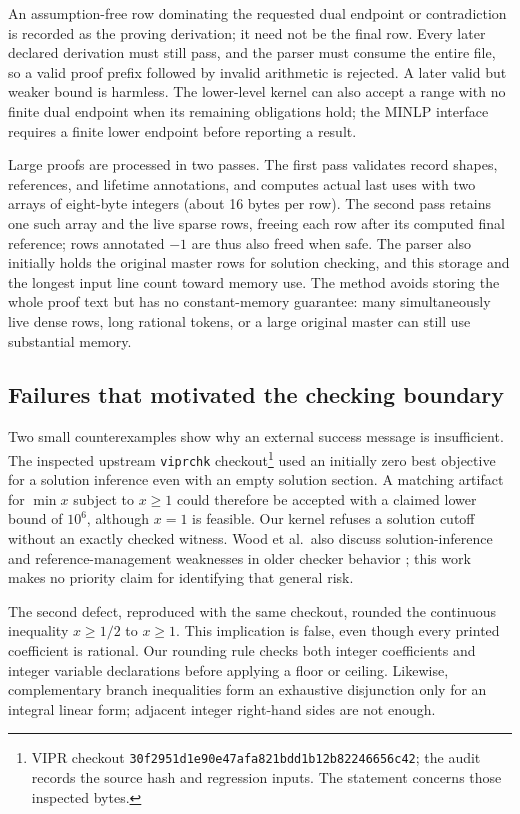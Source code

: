An assumption-free row dominating the requested dual endpoint or contradiction is recorded as the proving derivation; it need not be the final row. Every later declared derivation must still pass, and the parser must consume the entire file, so a valid proof prefix followed by invalid arithmetic is rejected. A later valid but weaker bound is harmless. The lower-level kernel can also accept a range with no finite dual endpoint when its remaining obligations hold; the MINLP interface requires a finite lower endpoint before reporting a result.

Large proofs are processed in two passes. The first pass validates record shapes, references, and lifetime annotations, and computes actual last uses with two arrays of eight-byte integers (about 16 bytes per row). The second pass retains one such array and the live sparse rows, freeing each row after its computed final reference; rows annotated $-1$ are thus also freed when safe. The parser also initially holds the original master rows for solution checking, and this storage and the longest input line count toward memory use. The method avoids storing the whole proof text but has no constant-memory guarantee: many simultaneously live dense rows, long rational tokens, or a large original master can still use substantial memory.

\subsection{Failures that motivated the checking boundary}
\label{sec:checker-repairs}
Two small counterexamples show why an external success message is insufficient. The inspected upstream \texttt{viprchk} checkout\footnote{VIPR checkout \texttt{30f2951d1e90e47afa821bdd1b12b82246656c42}; the audit records the source hash and regression inputs. The statement concerns those inspected bytes.} used an initially zero best objective for a solution inference even with an empty solution section. A matching artifact for $\min x$ subject to $x\geq1$ could therefore be accepted with a claimed lower bound of $10^6$, although $x=1$ is feasible. Our kernel refuses a solution cutoff without an exactly checked witness. Wood et al.\ also discuss solution-inference and reference-management weaknesses in older checker behavior \citep{wood2026-vipr-smt}; this work makes no priority claim for identifying that general risk.

The second defect, reproduced with the same checkout, rounded the continuous inequality $x\geq1/2$ to $x\geq1$. This implication is false, even though every printed coefficient is rational. Our rounding rule checks both integer coefficients and integer variable declarations before applying a floor or ceiling. Likewise, complementary branch inequalities form an exhaustive disjunction only for an integral linear form; adjacent integer right-hand sides are not enough.

